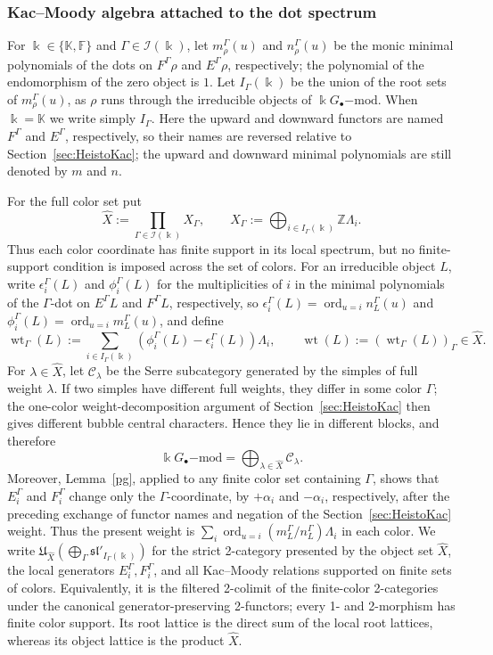 \documentclass[12pt]{amsart}
\numberwithin{itemcounter}{subsection}
\theoremstyle{plain}
\theoremstyle{definition}
\theoremstyle{remark}
\numberwithin{equation}{section}
\def\bbF{\mathbb{F}}
\def\bbK{\mathbb{K}}
\def\k{\Bbbk}
\def\fraks{\mathfrak{s}}
\def\frakl{\mathfrak{l}}
\def\frakU{\mathfrak{U}}
\def\calI{\mathcal{I}}
\def\frakl{\mathfrak{l}}
\begin{document}
\subsubsection{Kac--Moody algebra attached to the dot spectrum}
For \(\k\in\{\bbK,\bbF\}\) and \(\Gamma\in\calI(\k)\), let
\(m^\Gamma_\rho(u)\) and \(n^\Gamma_\rho(u)\) be the monic minimal
polynomials of the dots on \(F^\Gamma\rho\) and \(E^\Gamma\rho\),
respectively; the polynomial of the endomorphism of the zero object is \(1\).
Let \(I_\Gamma(\k)\) be the union of the root sets of \(m^\Gamma_\rho(u)\),
as \(\rho\) runs through the irreducible objects of
\(\k G_\bullet\mathrm{-mod}\).  When \(\k=\bbK\) we write simply
\(I_\Gamma\).  Here the upward and downward functors are named
\(F^\Gamma\) and \(E^\Gamma\), respectively, so their names are reversed
relative to Section~\ref{sec:HeistoKac}; the upward and downward minimal
polynomials are still denoted by \(m\) and \(n\).

For the full color set put
\[
 \widehat X:=\prod_{\Gamma\in\calI(\k)}X_\Gamma,
 \qquad
 X_\Gamma:=\bigoplus_{i\in I_\Gamma(\k)}\mathbb Z\Lambda_i.
\]
Thus each color coordinate has finite support in its local spectrum, but no
finite-support condition is imposed across the set of colors.  For an
irreducible object $L$, write $\epsilon_i^\Gamma(L)$ and
$\phi_i^\Gamma(L)$ for the multiplicities of $i$ in the minimal polynomials
of the $\Gamma$-dot on $E^\Gamma L$ and $F^\Gamma L$, respectively,
so $\epsilon_i^\Gamma(L)=\operatorname{ord}_{u=i}n_L^\Gamma(u)$ and
$\phi_i^\Gamma(L)=\operatorname{ord}_{u=i}m_L^\Gamma(u)$, and define
\[
 \operatorname{wt}_\Gamma(L)
 :=\sum_{i\in I_\Gamma(\k)}
   (\phi_i^\Gamma(L)-\epsilon_i^\Gamma(L))\Lambda_i,
 \qquad
 \operatorname{wt}(L):=(\operatorname{wt}_\Gamma(L))_\Gamma
 \in\widehat X.
\]
For $\lambda\in\widehat X$, let $\mathcal C_\lambda$ be the Serre
subcategory generated by the simples of full weight $\lambda$.  If two
simples have different full weights, they differ in some color $\Gamma$;
the one-color weight-decomposition argument of Section~\ref{sec:HeistoKac}
then gives different bubble central characters.  Hence they lie in different
blocks, and therefore
\[
 \k G_\bullet\mathrm{-mod}
 =\bigoplus_{\lambda\in\widehat X}\mathcal C_\lambda.
\]
Moreover, Lemma~\ref{pg}, applied to any finite color set containing
$\Gamma$, shows that $E_i^\Gamma$ and $F_i^\Gamma$ change only the
$\Gamma$-coordinate, by $+\alpha_i$ and $-\alpha_i$, respectively,
after the preceding exchange of functor names and negation of the
Section~\ref{sec:HeistoKac} weight.  Thus the present weight is
$\sum_i\operatorname{ord}_{u=i}(m_L^\Gamma/n_L^\Gamma)\Lambda_i$ in
each color.  We write
\(
\frakU_{\widehat X}(\bigoplus_\Gamma
\fraks\frakl'_{I_\Gamma(\k)})
\)
for the strict 2-category presented by the object set $\widehat X$,
the local generators $E_i^\Gamma,F_i^\Gamma$, and all Kac--Moody
relations supported on finite sets of colors.  Equivalently, it is the
filtered 2-colimit of the finite-color 2-categories under the canonical
generator-preserving 2-functors; every 1- and 2-morphism has finite color
support.  Its
root lattice is the direct sum of the local root lattices, whereas its object
lattice is the product $\widehat X$.
\end{document}
